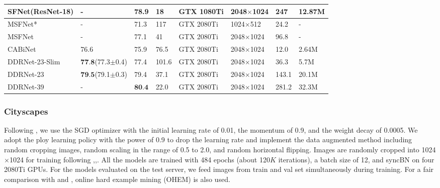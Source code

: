 \documentclass[journal]{IEEEtran}
\begin{document}
\begin{table*}[]
\begin{tabular}{p{80pt}p{43pt}<{\centering}p{43pt}<{\centering}p{50pt}<{\centering}p{50pt}<{\centering}p{50pt}<{\centering}p{50pt}<{\centering}p{50pt}<{\centering}}
SFNet(ResNet-18)\cite{li2020semantic}& -      &78.9     & 18       & GTX 1080Ti           & 2048$\times$1024             & 247                        & 12.87M                       \\ \midrule
MSFNet*\cite{si2019real}& -          & 71.3       & 117                  & GTX 2080Ti           & 1024$\times$512            & 24.2                        & -                       \\
MSFNet\cite{si2019real}& -           & 77.1       & 41                   & GTX 2080Ti           & 2048$\times$1024            & 96.8                        & -                       \\ \midrule
CABiNet\cite{kumaar2020cabinet}& 76.6      &75.9     & 76.5       & GTX 2080Ti           & 2048$\times$1024             & 12.0                        & 2.64M                       \\ \midrule
DDRNet-23-Slim& $\textbf{77.8}$(77.3$\pm$0.4)    & 77.4     & 101.6         & GTX 2080Ti           & 2048$\times$1024         & 36.3                        & 5.7M                   \\
DDRNet-23     & $\textbf{79.5}$(79.1$\pm$0.3)    & 79.4  & 37.1  & GTX 2080Ti           & 2048$\times$1024            & 143.1                        & 20.1M                   \\
DDRNet-39     & -             & $\textbf{80.4}$  & 22.0  & GTX 2080Ti           & 2048$\times$1024            & 281.2                        & 32.3M                   \\ \bottomrule
\end{tabular}
\end{table*}

\subsubsection{Cityscapes}

Following \cite{9052469}, we use the SGD optimizer with the initial learning rate of 0.01, the momentum of 0.9, and the weight decay of 0.0005. We adopt the ploy learning policy with the power of 0.9 to drop the learning rate and implement the data augmented method including random cropping images, random scaling in the range of 0.5 to 2.0, and random horizontal flipping. Images are randomly cropped into 1024$\times$1024 for training following \cite{li2019dfanet},\cite{si2019real},\cite{li2020semantic}. All the models are trained with 484 epochs (about 120$K$ iterations), a batch size of 12, and syncBN on four 2080Ti GPUs. For the models evaluated on the test server, we feed images from train and val set simultaneously during training. For a fair comparison with \cite{yu2020bisenet} and \cite{li2020semantic}, online hard example mining (OHEM)\cite{shrivastava2016training} is also used.
\end{document}
